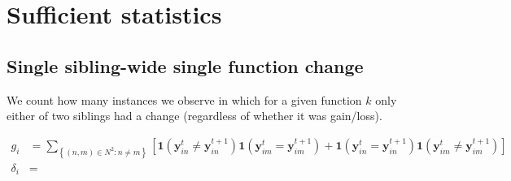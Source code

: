 \documentclass[11pt]{article}
\newcommand{\y}[2]{\mathbf{y}_{#1}^{#2}}
\newcommand{\one}[1]{\mathbf{1}\left(#1\right)}
\newcommand{\set}[1]{\left\{#1\right\}}
\begin{document}
\section{Sufficient statistics}

\subsection{Single sibling-wide single function change}

We count how many instances we observe in which for a given function $k$ only either of two siblings had a change (regardless of whether it was gain/loss). 

\begin{align}
	g_i & = \sum_{\set{(n,m) \in N^2: n\neq m}}\left[\one{\y{in}{t}\neq\y{in}{t+1}}\one{\y{im}{t}=\y{im}{t+1}} + \one{\y{in}{t}=\y{in}{t+1}}\one{\y{im}{t}\neq\y{im}{t+1}}\right] \\
	\delta_i & =
\end{align}
\end{document}
